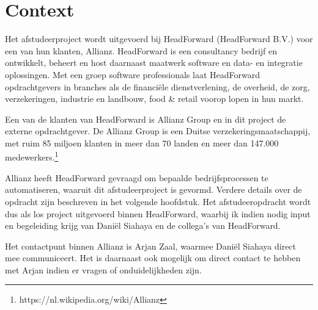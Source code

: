 \chapter{Context}
Het afstudeerproject wordt uitgevoerd bij HeadForward (HeadForward B.V.) voor een van hun klanten, Allianz. HeadForward is een consultancy bedrijf en ontwikkelt, beheert en host daarnaast maatwerk software en data- en integratie oplossingen. Met een groep software professionals laat HeadForward opdrachtgevers in branches als de financiële dienstverlening, de overheid, de zorg, verzekeringen, industrie en landbouw, food \& retail voorop lopen in hun markt.\par

Een van de klanten van HeadForward is Allianz Group en in dit project de externe opdrachtgever. De Allianz Group is een Duitse verzekeringsmaatschappij, met ruim 85 miljoen klanten in meer dan 70 landen en meer dan 147.000 medewerkers.\footnote{https://nl.wikipedia.org/wiki/Allianz} \par

Allianz heeft HeadForward gevraagd om bepaalde bedrijfsprocessen te automatiseren, waaruit dit afstudeerproject is gevormd. Verdere details over de opdracht zijn beschreven in het volgende hoofdstuk. Het afstudeeropdracht wordt dus als los project uitgevoerd binnen HeadForward, waarbij ik indien nodig input en begeleiding krijg van Dani\"el Siahaya en de collega's van HeadForward.\par

Het contactpunt binnen Allianz is Arjan Zaal, waarmee Dani\"el Siahaya direct mee communiceert. Het is daarnaast ook mogelijk om direct contact te hebben met Arjan indien er vragen of onduidelijkheden zijn.\par